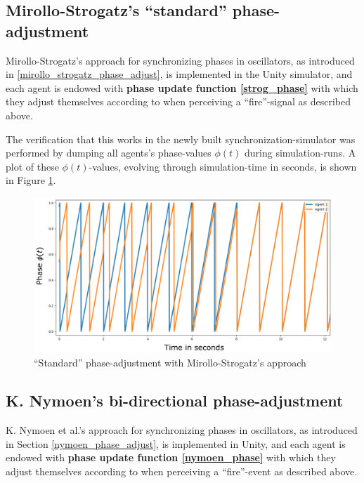 	
	
	\subsection{Mirollo-Strogatz's ``standard'' phase-adjustment} %
	
	Mirollo-Strogatz's approach for synchronizing phases in oscillators, as introduced in \ref{mirollo_strogatz_phase_adjust}, is implemented in the Unity simulator, and each agent is endowed with \textbf{phase update function \eqref{strog_phase}} with which they adjust themselves according to when perceiving a ``fire''-signal as described above.
	
	The verification that this works in the newly built synchronization-simulator was performed by dumping all agents's phase-values $\phi(t)$ during simulation-runs. A plot of these $\phi(t)$-values, evolving through simulation-time in seconds, is shown in Figure \ref{fig:strog_phase}.
	
	\begin{figure}[h]
		\centering
		\includegraphics[width=0.9\linewidth]{Assets/Figures/MirolloStrogatzPhaseAdjustmentSecondTry.pdf}
		\caption[Illustration of Mirollo-Strogatz's ``standard'' phase-adjustment]{``Standard'' phase-adjustment with Mirollo-Strogatz's approach}
		\label{fig:strog_phase}
	\end{figure}
	
	
	
	
	\subsection{K. Nymoen's bi-directional phase-adjustment} %
	
	K. Nymoen et al.'s approach for synchronizing phases in oscillators, as introduced in Section \ref{nymoen_phase_adjust}, is implemented in Unity, and each agent is endowed with \textbf{phase update function \eqref{nymoen_phase}} with which they adjust themselves according to when perceiving a ``fire''-event as described above.
	
